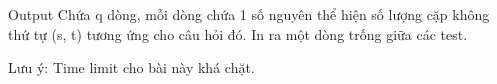 Output  
Chứa q dòng, mỗi dòng chứa 1 số nguyên thể hiện số lượng cặp không thứ tự (s, t) tương ứng cho câu hỏi đó. In ra một dòng trống giữa các test.  

   Lưu ý: Time limit cho bài này khá chặt.